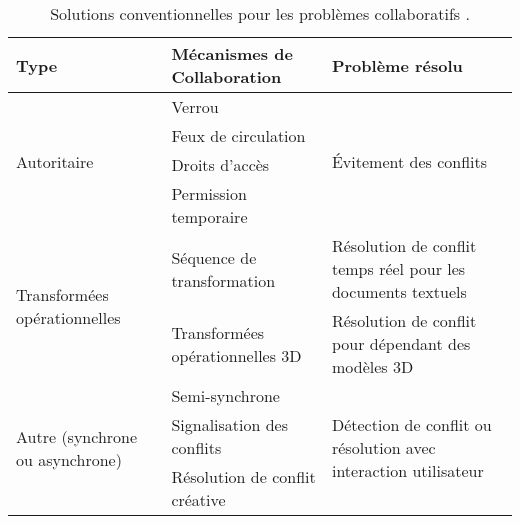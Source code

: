 \begin{table}
	\centering
	\noindent
	\caption{Solutions conventionnelles pour les problèmes collaboratifs 
	\cite{Yu2016}.}
	
	\small
	\label{table:collprobs}
	\begin{tabular}{ m{}  m{} m{}}\hline
		\textbf{Type}& \textbf{Mécanismes de Collaboration} & \textbf{Problème 
		résolu}    \\ \hline
		\multirow{4}{*}{Autoritaire}                     & Verrou                        & 
		\multirow{4}{*}{Évitement des conflits}                                          \\
		& Feux de circulation  
		&                                                                                  \\
		& Droits d'accès               
		&                                                                                  \\
		& Permission temporaire        
		&                                                                                  \\ \hline
		\multirow{2}{0.2\textwidth}{Transformées opérationnelles}                     & 
		Séquence de transformation                     & Résolution de conflit temps réel 
		pour les documents textuels                     \\ \cline{2-3} 
		& Transformées opérationnelles 3D                 & Résolution de conflit pour 
		dépendant des modèles 3D                              \\ \hline
		\multirow{3}{0.2\textwidth}{Autre (synchrone ou asynchrone)} & 
		Semi-synchrone                               & \multirow{3}{0.3\textwidth}{Détection 
		de conflit ou résolution avec interaction utilisateur} \\
		& Signalisation des conflits %
		&                                                                                  \\
		& Résolution de conflit créative                 &                      \\ 
		\bottomrule                                                           
	\end{tabular}
\end{table}


